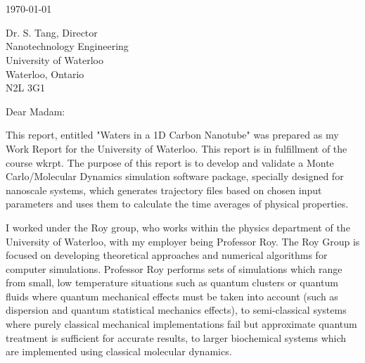\documentclass{ece}
\begin{document}

\maketitle



\printauthorstreetaddress\\
\printauthorlocation\\
\printauthorpostalcode

\today

Dr. S. Tang, Director\\
Nanotechnology Engineering\\
University of Waterloo\\
Waterloo, Ontario\\
N2L 3G1

Dear Madam:

This report, entitled "Waters in a 1D Carbon Nanotube" was prepared as my \printterm Work Report for the University of Waterloo. This report is in fulfillment of the course \gls{wkrpt}. The purpose of this report is to develop and validate a Monte Carlo/Molecular Dynamics simulation software package, specially designed for nanoscale systems, which generates trajectory files based on chosen input parameters and uses them to calculate the time averages of physical properties. 

I worked under the Roy group, who works within the physics department of the University of Waterloo, with my employer being Professor Roy. The Roy Group is focused on developing theoretical approaches and numerical algorithms for computer simulations. Professor Roy performs sets of simulations which range from small, low temperature situations such as quantum clusters or quantum fluids where quantum mechanical effects must be taken into account (such as dispersion and quantum statistical mechanics effects), to semi-classical systems where purely classical mechanical implementations fail but approximate quantum treatment is sufficient for accurate results, to larger biochemical systems which are implemented using classical molecular dynamics. 
\end{document}
